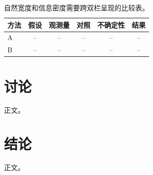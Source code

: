 \documentclass[UTF8,a4paper,10pt,twocolumn]{ctexart}
\theoremstyle{definition}
\theoremstyle{remark}
\begin{document}
\begin{table}[t]
  \caption{自然宽度和信息密度需要跨双栏呈现的比较表。\label{tab:two-column-zh}}
  \begin{tabular*}{\textwidth}{@{\extracolsep{\fill}}lccccc@{}}
  \toprule
  方法 & 假设 & 观测量 & 对照 & 不确定性 & 结果 \\
  \midrule
  A & -- & -- & -- & -- & -- \\
  B & -- & -- & -- & -- & -- \\
  \bottomrule
  \end{tabular*}
\end{table}


\section{讨论}

正文。

\section{结论}

正文。

\end{document}
